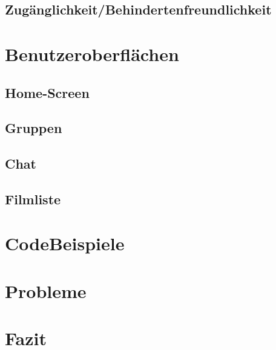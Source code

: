 \documentclass[11pt,a4paper]{article}
\begin{document}
\subsection{Zugänglichkeit/Behindertenfreundlichkeit}		


\section{Benutzeroberflächen}
\subsection{Home-Screen}
\subsection{Gruppen}		
\subsection{Chat}		
\subsection{Filmliste}

\section{CodeBeispiele}


\section{Probleme}


\section{Fazit}
\newpage
\end{document}
